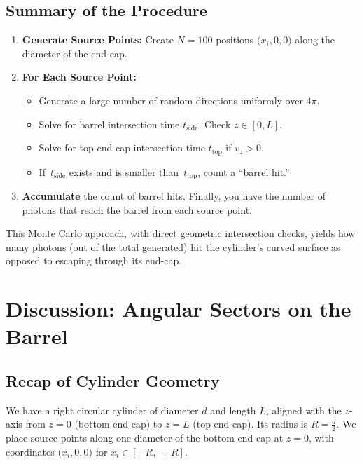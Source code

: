 \documentclass[11pt]{article}
\begin{document}
\subsection{Summary of the Procedure}
\begin{enumerate}
\item \textbf{Generate Source Points:} Create \(N=100\) positions \(\bigl(x_i,0,0\bigr)\) along the diameter of the end-cap.
\item \textbf{For Each Source Point:} 
  \begin{itemize}
    \item Generate a large number of random directions uniformly over \(4\pi\).
    \item Solve for barrel intersection time \(t_{\mathrm{side}}\). Check \(z\in[0,L]\).
    \item Solve for top end-cap intersection time \(t_{\mathrm{top}}\) if \(v_z>0\).
    \item If \(\,t_{\mathrm{side}}\) exists and is smaller than \(\,t_{\mathrm{top}}\), count a ``barrel hit.''
  \end{itemize}
\item \textbf{Accumulate} the count of barrel hits. Finally, you have the number of photons that reach the barrel from each source point.
\end{enumerate}

This Monte Carlo approach, with direct geometric intersection checks, yields how many photons (out of the total generated) hit the cylinder's curved surface as opposed to escaping through its end-cap.


\section{Discussion: Angular Sectors on the Barrel}

\subsection{Recap of Cylinder Geometry}
We have a right circular cylinder of diameter \(d\) and length \(L\), aligned with the \(z\)-axis from \(z=0\) (bottom end-cap) to \(z=L\) (top end-cap). Its radius is \(R = \tfrac{d}{2}\). We place source points along one diameter of the bottom end-cap at \(z=0\), with coordinates \(\bigl(x_i,0,0\bigr)\) for \(x_i \in [-R,\,+R]\).
\end{document}
